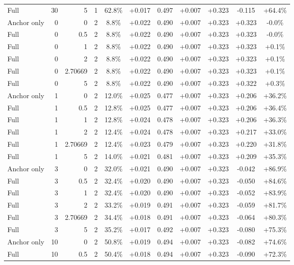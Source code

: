 \begin{table}[htbp]
\begin{tabular}{lrrrccccccc}
Full & 30 & 5 & 1 & 62.8\% & +0.017 & 0.497 & +0.007 & +0.323 & -0.115 & +64.4\% \\
Anchor only & 0 & 0 & 2 & 8.8\% & +0.022 & 0.490 & +0.007 & +0.323 & +0.323 & -0.0\% \\
Full & 0 & 0.5 & 2 & 8.8\% & +0.022 & 0.490 & +0.007 & +0.323 & +0.323 & -0.0\% \\
Full & 0 & 1 & 2 & 8.8\% & +0.022 & 0.490 & +0.007 & +0.323 & +0.323 & +0.1\% \\
Full & 0 & 2 & 2 & 8.8\% & +0.022 & 0.490 & +0.007 & +0.323 & +0.323 & +0.1\% \\
Full & 0 & 2.70669 & 2 & 8.8\% & +0.022 & 0.490 & +0.007 & +0.323 & +0.323 & +0.1\% \\
Full & 0 & 5 & 2 & 8.8\% & +0.022 & 0.490 & +0.007 & +0.323 & +0.322 & +0.3\% \\
Anchor only & 1 & 0 & 2 & 12.0\% & +0.025 & 0.477 & +0.007 & +0.323 & +0.206 & +36.2\% \\
Full & 1 & 0.5 & 2 & 12.8\% & +0.025 & 0.477 & +0.007 & +0.323 & +0.206 & +36.4\% \\
Full & 1 & 1 & 2 & 12.8\% & +0.024 & 0.478 & +0.007 & +0.323 & +0.206 & +36.3\% \\
Full & 1 & 2 & 2 & 12.4\% & +0.024 & 0.478 & +0.007 & +0.323 & +0.217 & +33.0\% \\
Full & 1 & 2.70669 & 2 & 12.4\% & +0.023 & 0.479 & +0.007 & +0.323 & +0.220 & +31.8\% \\
Full & 1 & 5 & 2 & 14.0\% & +0.021 & 0.481 & +0.007 & +0.323 & +0.209 & +35.3\% \\
Anchor only & 3 & 0 & 2 & 32.0\% & +0.021 & 0.490 & +0.007 & +0.323 & -0.042 & +86.9\% \\
Full & 3 & 0.5 & 2 & 32.4\% & +0.020 & 0.490 & +0.007 & +0.323 & -0.050 & +84.6\% \\
Full & 3 & 1 & 2 & 32.4\% & +0.020 & 0.490 & +0.007 & +0.323 & -0.052 & +83.9\% \\
Full & 3 & 2 & 2 & 33.2\% & +0.019 & 0.491 & +0.007 & +0.323 & -0.059 & +81.7\% \\
Full & 3 & 2.70669 & 2 & 34.4\% & +0.018 & 0.491 & +0.007 & +0.323 & -0.064 & +80.3\% \\
Full & 3 & 5 & 2 & 35.2\% & +0.017 & 0.492 & +0.007 & +0.323 & -0.080 & +75.3\% \\
Anchor only & 10 & 0 & 2 & 50.8\% & +0.019 & 0.494 & +0.007 & +0.323 & -0.082 & +74.6\% \\
Full & 10 & 0.5 & 2 & 50.4\% & +0.018 & 0.494 & +0.007 & +0.323 & -0.090 & +72.3\% \\

\end{tabular}
\end{table}

